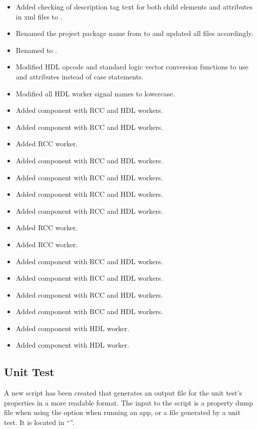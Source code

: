 \begin{itemize}
\item Added checking of description tag text for both child elements and attributes in xml files to .
\item Renamed the project package name from  to  and updated all  files accordingly.
\item Renamed  to .
\item Modified HDL opcode and standard logic vector conversion functions to use  and  attributes instead of case statements.
\item Modified all HDL worker signal names to lowercase.
\item Added  component with RCC and HDL workers.
\item Added  component with RCC and HDL workers.
\item Added  RCC worker.
\item Added  component with RCC and HDL workers.
\item Added  component with RCC and HDL workers.
\item Added  component with RCC and HDL workers.
\item Added  component with RCC and HDL workers.
\item Added  RCC worker.
\item Added  RCC worker.
\item Added  component with RCC and HDL workers.
\item Added  component with RCC and HDL workers.
\item Added  component with RCC and HDL workers.
\item Added  component with RCC and HDL workers.
\item Added  component with HDL worker.
\item Added  component with HDL worker.
\end{itemize}

\subsection{ Unit Test}
\label{sec:23_capture_v2}
A new script has been created that generates an output file for the  unit test's properties in a more readable format.  The input to the script is a property dump file when using the  option when running an app, or a  file generated by a unit test. It is located in ``''.

